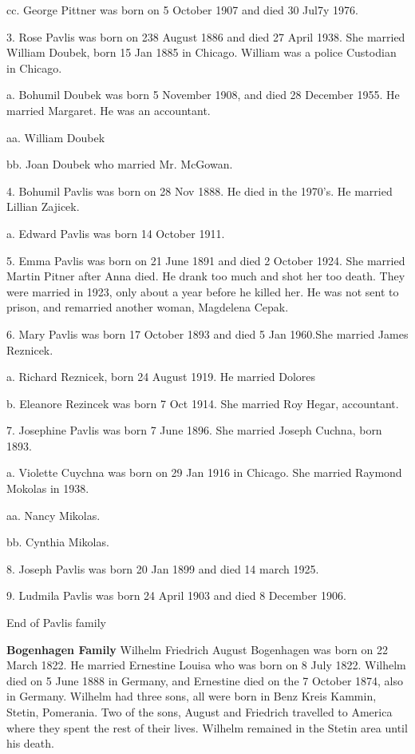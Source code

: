 \documentclass[a4paper]{article}
\begin{document}
cc. George Pittner was born on 5 October 1907 and died 30 Jul7y 1976.

3. Rose Pavlis was born on 238 August 1886 and died 27 April 1938.  She married William Doubek, born 15 Jan 1885 in Chicago.  William was a police Custodian in Chicago.  

a. Bohumil Doubek was born 5 November 1908, and died 28 December 1955.  He married Margaret.  He was an accountant.

aa. William Doubek

bb. Joan Doubek who married Mr. McGowan.

4. Bohumil Pavlis was born on 28 Nov 1888.  He died in the 1970's. He married Lillian Zajicek.  

a. Edward Pavlis was born 14 October 1911.  

5. Emma Pavlis was born on 21 June 1891 and died 2 October 1924.  She married Martin Pitner after Anna died.  He drank too much and shot her too death. They were married in 1923, only about a year before he killed her.  He was not sent to prison, and remarried another woman, Magdelena Cepak.  

6. Mary Pavlis was born 17 October 1893 and died 5 Jan 1960.She married James Reznicek.

a. Richard Reznicek, born 24 August 1919.  He married Dolores

b. Eleanore Rezincek was born 7 Oct 1914.  She married Roy Hegar, accountant.

7. Josephine Pavlis was born 7 June 1896.  She married Joseph Cuchna, born 1893.  

a. Violette Cuychna was born on 29 Jan 1916 in Chicago.  She married Raymond Mokolas in 1938.

aa. Nancy Mikolas.

bb. Cynthia Mikolas.

8. Joseph Pavlis was born 20 Jan 1899 and died 14 march 1925.

9. Ludmila Pavlis was born 24 April 1903 and died 8 December 1906.  

\vskip 4mm
End of Pavlis family
\pagebreak

{\noindent \Huge \bf Bogenhagen Family}
\vskip 6mm
	Wilhelm Friedrich August Bogenhagen was born on 22 March 1822.  He married Ernestine Louisa who was born on 8 July 1822.  Wilhelm died on 5 June 1888 in Germany, and Ernestine died on the 7 October 1874, also in Germany.  Wilhelm had three sons, all were born in Benz Kreis Kammin, Stetin, Pomerania.   Two of the sons, August and Friedrich travelled to America where they spent the rest of their lives. Wilhelm remained in the Stetin area until his death.
\end{document}
